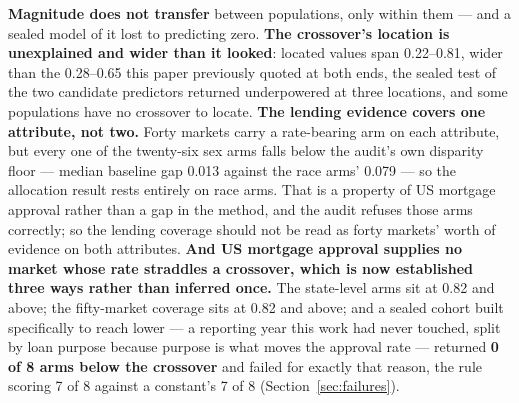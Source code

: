 \documentclass[conference]{IEEEtran}
\begin{document}
\textbf{Magnitude does not transfer} between populations, only within them --- and a sealed
model of it lost to predicting zero. \textbf{The crossover's location is unexplained and wider than it looked}: located values span 0.22--0.81, wider than the 0.28--0.65 this paper previously quoted at both ends, the sealed test of the two candidate
predictors returned underpowered at three locations, and some populations have no crossover
to locate. \textbf{The lending evidence covers one attribute, not two.} Forty markets carry a
rate-bearing arm on each attribute, but every one of the twenty-six sex arms falls below the audit's own
disparity floor --- median baseline gap 0.013 against the race arms' 0.079 --- so the
allocation result rests entirely on race arms. That is a property of US mortgage approval
rather than a gap in the method, and the audit refuses those arms correctly; so the lending coverage should not be read as forty markets' worth of evidence on both
attributes. \textbf{And US mortgage approval supplies no market whose rate straddles a
crossover, which is now established three ways rather than inferred once.} The state-level
arms sit at 0.82 and above; the fifty-market coverage sits at 0.82 and above; and a sealed
cohort built specifically to reach lower --- a reporting year this work had never touched,
split by loan purpose because purpose is what moves the approval rate --- returned
\textbf{0 of 8 arms below the crossover} and failed for exactly that reason, the rule scoring
7 of 8 against a constant's 7 of 8 (Section~\ref{sec:failures}).
\end{document}
